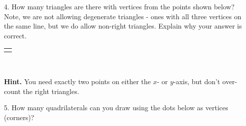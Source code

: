 \documentclass[12pt,]{book}
\theoremstyle{plain}
\theoremstyle{definition}
\theoremstyle{definition}
\theoremstyle{definition}
\numberwithin{equation}{chapter}
\newlength{\panelmax}
\begin{document}
\begin{exerciselist}
\begin{enumerate}[label=(\alph*)]
\end{enumerate}
%
\par\smallskip
\item[4.]\hypertarget{exercise-120}{}\hypertarget{p-975}{}%
How many triangles are there with vertices from the points shown below? Note, we are not allowing degenerate triangles - ones with all three vertices on the same line, but we do allow non-right triangles. Explain why your answer is correct.%
{%
\setlength{\panelmax}{0pt}
\ifdefined\panelboxAimage\else\newsavebox{\panelboxAimage}\fi%
\begin{lrbox}{\panelboxAimage}
\end{lrbox}
\ifdefined\phAimage\else\newlength{\phAimage}\fi%
\setlength{\phAimage}{\ht\panelboxAimage+\dp\panelboxAimage}
\settototalheight{\phAimage}{\usebox{\panelboxAimage}}
\setlength{\panelmax}{\maxof{\panelmax}{\phAimage}}
\leavevmode%
\setlength{\tabcolsep}{0\linewidth}
\par\medskip\noindent
\hspace*{0.25\linewidth}%
\begin{tabular}{@{}*{1}{c}@{}}
\begin{minipage}[c][\panelmax][t]{0.5\linewidth}\usebox{\panelboxAimage}\end{minipage}\end{tabular}\\
}%
\par\smallskip
\par\smallskip%
\noindent\textbf{Hint.}\hypertarget{hint-7}{}\quad%
\hypertarget{p-976}{}%
You need exactly two points on either the \(x\)- or \(y\)-axis, but don't over-count the right triangles.%
\item[5.]\hypertarget{exercise-121}{}\hypertarget{p-977}{}%
How many quadrilaterals can you draw using the dots below as vertices (corners)?%

\end{exerciselist}
\end{document}
